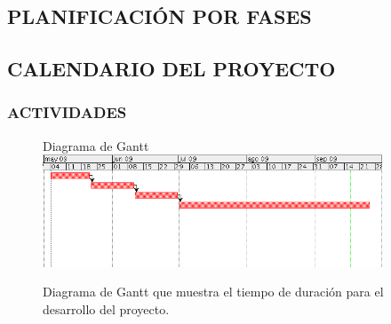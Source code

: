 \subsection{PLANIFICACIÓN POR FASES}

\subsection{CALENDARIO DEL PROYECTO}

\subsubsection{ACTIVIDADES}
\begin{figure}[htb]
  Diagrama de Gantt
  \centering
  \includegraphics[width=0.9\textwidth]{imagenes/Gantt.png}%
  \caption{Diagrama de Gantt que muestra el tiempo de duración para el desarrollo del proyecto.}
  \label{contexto:figura}
\end{figure}

%
